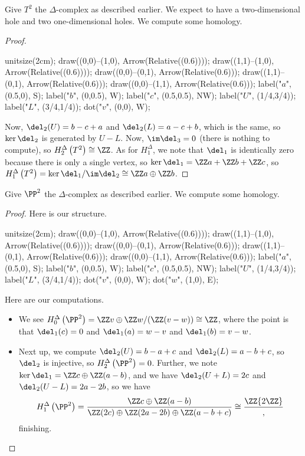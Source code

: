 \documentclass[../notes.tex]{subfiles}
\begin{document}
\begin{example}
	Give $T^2$ the $\Delta$-complex as described earlier. We expect to have a two-dimensional hole and two one-dimensional holes. We compute some homology.
\end{example}
\begin{proof}
	\begin{center}
		\begin{asy}
			unitsize(2cm);
			draw((0,0)--(1,0), Arrow(Relative((0.6))));
			draw((1,1)--(1,0), Arrow(Relative((0.6))));
			draw((0,0)--(0,1), Arrow(Relative(0.6)));
			draw((1,1)--(0,1), Arrow(Relative(0.6)));
			draw((0,0)--(1,1), Arrow(Relative(0.6)));
			label("$a$", (0.5,0), S);
			label("$b$", (0,0.5), W);
			label("$c$", (0.5,0.5), NW);
			label("$U$", (1/4,3/4));
			label("$L$", (3/4,1/4));
			dot("$v$", (0,0), W);
		\end{asy}
	\end{center}
	Now, $\del_2(U)=b-c+a$ and $\del_2(L)=a-c+b$, which is the same, so $\ker\del_2$ is generated by $U-L$. Now, $\im\del_3=0$ (there is nothing to compute), so $H_2^\Delta\left(T^2\right)\cong\ZZ$. As for $H_1^\Delta$, we note that $\del_1$ is identically zero because there is only a single vertex, so $\ker\del_1=\ZZ a+\ZZ b+\ZZ c$, so $H_1^\Delta\left(T^2\right)=\ker\del_1/\im\del_2\cong\ZZ a\oplus\ZZ b$.
\end{proof}
\begin{example}
	Give $\PP^2$ the $\Delta$-complex as described earlier. We compute some homology.
\end{example}
\begin{proof}
	Here is our structure.
	\begin{center}
		\begin{asy}
			unitsize(2cm);
			draw((0,0)--(1,0), Arrow(Relative((0.6))));
			draw((1,1)--(1,0), Arrow(Relative((0.6))));
			draw((0,0)--(0,1), Arrow(Relative(0.6)));
			draw((1,1)--(0,1), Arrow(Relative(0.6)));
			draw((0,0)--(1,1), Arrow(Relative(0.6)));
			label("$a$", (0.5,0), S);
			label("$b$", (0,0.5), W);
			label("$c$", (0.5,0.5), NW);
			label("$U$", (1/4,3/4));
			label("$L$", (3/4,1/4));
			dot("$v$", (0,0), W);
			dot("$w$", (1,0), E);
		\end{asy}
	\end{center}
	Here are our computations.
	\begin{itemize}
		\item We see $H_0^\Delta\left(\PP^2\right)=\ZZ v\oplus\ZZ w/(\ZZ(v-w))\cong\ZZ$, where the point is that $\del_1(c)=0$ and $\del_1(a)=w-v$ and $\del_1(b)=v-w$.
		\item Next up, we compute $\del_2(U)=b-a+c$ and $\del_2(L)=a-b+c$, so $\del_2$ is injective, so $H_2^\Delta\left(\PP^2\right)=0$. Further, we note $\ker\del_1=\ZZ c\oplus\ZZ(a-b)$, and we have $\del_2(U+L)=2c$ and $\del_2(U-L)=2a-2b$, so we have
		\[H_1^\Delta\left(\PP^2\right)=\frac{\ZZ c\oplus\ZZ(a-b)}{\ZZ(2c)\oplus\ZZ(2a-2b)\oplus\ZZ(a-b+c)}\cong\frac\ZZ{2\ZZ},\]
		finishing.
		\qedhere
	\end{itemize}
\end{proof}
\end{document}
